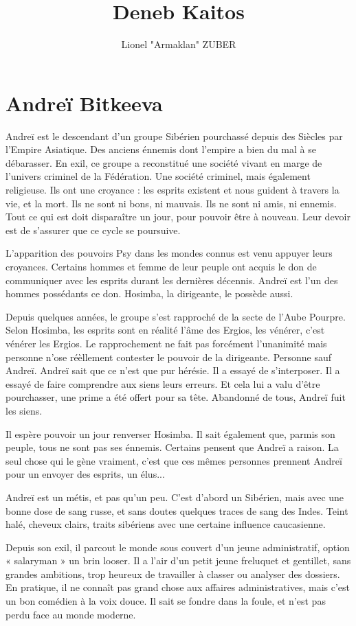 \documentclass{DenebClass}
\title{Deneb Kaitos}
\author{Lionel "Armaklan" ZUBER}
\begin{document}
\chapter*{Andreï Bitkeeva}

Andreï est le descendant d'un groupe Sibérien pourchassé depuis des Siècles par l'Empire Asiatique. Des anciens énnemis dont l'empire a bien du mal à se débarasser. En exil, ce groupe a reconstitué une société vivant en marge de l'univers criminel de la Fédération. Une société criminel, mais également religieuse. Ils ont une croyance : les esprits existent et nous guident à travers la vie, et la mort. Ils ne sont ni bons, ni mauvais. Ils ne sont ni amis, ni ennemis. Tout ce qui est doit disparaître un jour, pour pouvoir être à nouveau. Leur devoir est de s'assurer que ce cycle se poursuive.

L'apparition des pouvoirs Psy dans les mondes connus est venu appuyer leurs croyances. Certains hommes et femme de leur peuple ont acquis le don de communiquer avec les esprits durant les dernières décennis. Andreï est l'un des hommes possédants ce don. Hosimba, la dirigeante, le possède aussi.

Depuis quelques années, le groupe s'est rapproché de la secte de l'Aube Pourpre. Selon Hosimba, les esprits sont en réalité l'âme des Ergios, les vénérer, c'est vénérer les Ergios. Le rapprochement ne fait pas forcément l'unanimité mais personne n'ose réèllement contester le pouvoir de la dirigeante. Personne sauf Andreï. Andreï sait que ce n'est que pur hérésie. Il a essayé de s'interposer. Il a essayé  de faire comprendre aux siens leurs erreurs. Et cela lui a valu d'être pourchasser, une prime a été offert pour sa tête. Abandonné de tous, Andreï fuit les siens.

Il espère pouvoir un jour renverser Hosimba. Il sait également que, parmis son peuple, tous ne sont pas ses énnemis. Certains pensent que Andreï a raison. La seul chose qui le gène vraiment, c'est que ces mêmes personnes prennent Andreï pour un envoyer des esprits, un élus...


Andreï est un métis, et pas qu'un peu. C'est d'abord un Sibérien, mais avec une bonne dose de sang russe, et sans doutes quelques traces de sang des Indes. Teint halé, cheveux clairs, traits sibériens avec une certaine influence caucasienne.

Depuis son exil, il parcout le monde sous couvert d'un jeune administratif, option « salaryman » un brin looser. Il a l'air d'un petit jeune freluquet et gentillet, sans grandes ambitions, trop heureux de travailler à classer ou analyser des dossiers. En pratique, il ne connaît pas grand chose aux affaires administratives, mais c'est un bon comédien à la voix douce. Il sait se fondre dans la foule, et n'est pas perdu face au monde moderne.
\end{document}
